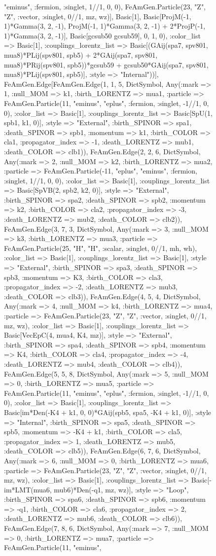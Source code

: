 \documentclass{revtex4}
\begin{document}
\begin{figure}[!htb]
\begin{center}
{"eminus", :fermion, :singlet, 1//1, 0, 0), FeAmGen.Particle(23, "Z", "Z", :vector, :singlet, 0//1, mz, wz)], Basic[1], Basic[ProjM(-1, 1)*Gamma(3, 2, -1), ProjM(-1, 1)*Gamma(3, 2, -1) + 2*ProjP(-1, 1)*Gamma(3, 2, -1)], Basic[gcsub50 gcsub59], 0, 1, 0), :color_list => Basic[1], :couplings_lorentz_list => Basic[(GAij(spa7, spv801, mua8)*PLij(spv801, spb5) + 2*GAij(spa7, spv801, mua8)*PRij(spv801, spb5))*gcsub59 + gcsub50*GAij(spa7, spv801, mua8)*PLij(spv801, spb5)], :style => "Internal"))], FeAmGen.Edge[FeAmGen.Edge(1, 1, 5, Dict{Symbol, Any}(:mark => 1, :null_MOM => k1, :birth_LORENTZ => mua1, :particle => FeAmGen.Particle(11, "eminus", "eplus", :fermion, :singlet, -1//1, 0, 0), :color_list => Basic[1], :couplings_lorentz_list => Basic[SpU(1, spb1, k1, 0)], :style => "External", :birth_SPINOR => spa1, :death_SPINOR => spb1, :momentum => k1, :birth_COLOR => cla1, :propagator_index => -1, :death_LORENTZ => mub1, :death_COLOR => clb1)), FeAmGen.Edge(2, 2, 6, Dict{Symbol, Any}(:mark => 2, :null_MOM => k2, :birth_LORENTZ => mua2, :particle => FeAmGen.Particle(-11, "eplus", "eminus", :fermion, :singlet, 1//1, 0, 0), :color_list => Basic[1], :couplings_lorentz_list => Basic[SpVB(2, spb2, k2, 0)], :style => "External", :birth_SPINOR => spa2, :death_SPINOR => spb2, :momentum => k2, :birth_COLOR => cla2, :propagator_index => -3, :death_LORENTZ => mub2, :death_COLOR => clb2)), FeAmGen.Edge(3, 7, 3, Dict{Symbol, Any}(:mark => 3, :null_MOM => k3, :birth_LORENTZ => mua3, :particle => FeAmGen.Particle(25, "H", "H", :scalar, :singlet, 0//1, mh, wh), :color_list => Basic[1], :couplings_lorentz_list => Basic[1], :style => "External", :birth_SPINOR => spa3, :death_SPINOR => spb3, :momentum => K3, :birth_COLOR => cla3, :propagator_index => -2, :death_LORENTZ => mub3, :death_COLOR => clb3)), FeAmGen.Edge(4, 5, 4, Dict{Symbol, Any}(:mark => 4, :null_MOM => k4, :birth_LORENTZ => mua4, :particle => FeAmGen.Particle(23, "Z", "Z", :vector, :singlet, 0//1, mz, wz), :color_list => Basic[1], :couplings_lorentz_list => Basic[VecEpC(4, mua4, K4, mz)], :style => "External", :birth_SPINOR => spa4, :death_SPINOR => spb4, :momentum => K4, :birth_COLOR => cla4, :propagator_index => -4, :death_LORENTZ => mub4, :death_COLOR => clb4)), FeAmGen.Edge(5, 5, 8, Dict{Symbol, Any}(:mark => 5, :null_MOM => 0, :birth_LORENTZ => mua5, :particle => FeAmGen.Particle(11, "eminus", "eplus", :fermion, :singlet, -1//1, 0, 0), :color_list => Basic[1], :couplings_lorentz_list => Basic[im*Den(-K4 + k1, 0, 0)*GAij(spb5, spa5, -K4 + k1, 0)], :style => "Internal", :birth_SPINOR => spa5, :death_SPINOR => spb5, :momentum => -K4 + k1, :birth_COLOR => cla5, :propagator_index => 1, :death_LORENTZ => mub5, :death_COLOR => clb5)), FeAmGen.Edge(6, 7, 6, Dict{Symbol, Any}(:mark => 6, :null_MOM => 0, :birth_LORENTZ => mua6, :particle => FeAmGen.Particle(23, "Z", "Z", :vector, :singlet, 0//1, mz, wz), :color_list => Basic[1], :couplings_lorentz_list => Basic[-im*LMT(mua6, mub6)*Den(-q1, mz, wz)], :style => "Loop", :birth_SPINOR => spa6, :death_SPINOR => spb6, :momentum => -q1, :birth_COLOR => cla6, :propagator_index => 2, :death_LORENTZ => mub6, :death_COLOR => clb6)), FeAmGen.Edge(7, 8, 6, Dict{Symbol, Any}(:mark => 7, :null_MOM => 0, :birth_LORENTZ => mua7, :particle => FeAmGen.Particle(11, "eminus", }
\end{center}
\end{figure}
\end{document}
